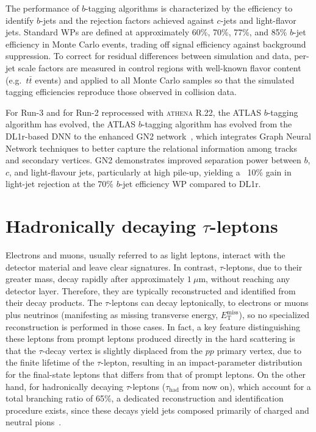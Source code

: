 The performance of $b$-tagging algorithms is characterized by the efficiency to identify $b$-jets and the rejection factors achieved against $c$-jets and light-flavor jets. Standard WPs are defined at approximately 60\%, 70\%, 77\%, and 85\% $b$-jet efficiency in \ttbar Monte Carlo events, trading off signal efficiency against background suppression.  To correct for residual differences between simulation and data, per-jet scale factors are measured in control regions with well-known flavor content (e.g.\ $t\bar t$ events) and applied to all Monte Carlo samples so that the simulated tagging efficiencies reproduce those observed in collision data.

For Run-3 and for Run-2 reprocessed with \textsc{athena} R.22, the ATLAS $b$-tagging algorithm has evolved, the ATLAS $b$-tagging algorithm has evolved from the DL1r-based DNN to the enhanced GN2 network~\cite{new_tagging}, which integrates Graph Neural Network techniques to better capture the relational information among tracks and secondary vertices. GN2 demonstrates improved separation power between \(b\), \(c\), and light-flavour jets, particularly at high pile-up, yielding a ~10\% gain in light-jet rejection at the 70\% \(b\)-jet efficiency WP compared to DL1r.  


\section{Hadronically decaying $\tau$-leptons}
\label{sec:tauhad}
Electrons and muons, usually referred to as light leptons, interact with the detector material and leave clear signatures. In contrast, \(\tau\)-leptons, due to their greater mass, decay rapidly after approximately \(1\ \mu\mathrm{m}\), without reaching any detector layer. Therefore, they are typically reconstructed and identified from their decay products. The \(\tau\)-leptons can decay leptonically, to electrons or muons plus neutrinos (manifesting as missing transverse energy, \(E_{\mathrm{T}}^{\mathrm{miss}}\)), so no specialized reconstruction is performed in those cases. 
In fact, a key feature distinguishing these leptons from prompt leptons produced directly in the hard scattering is that the \(\tau\)-decay vertex is slightly displaced from the \(pp\) primary vertex, due to the finite lifetime of the \(\tau\)-lepton, resulting in an impact-parameter distribution for the final-state leptons that differs from that of prompt leptons. 
On the other hand, for hadronically decaying \(\tau\)-leptons (\(\tau_{\text{had}}\) from now on), which account for a total branching ratio of 65\%, a dedicated reconstruction and identification procedure exists, since these decays yield jets composed primarily of charged and neutral pions~\cite{ParticleDataGroup}.

